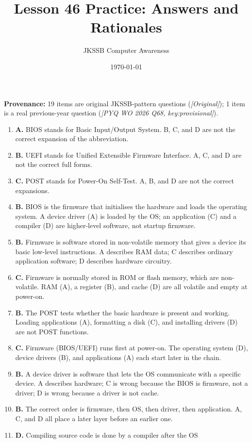 \documentclass[11pt]{article}
\title{Lesson 46 Practice: Answers and Rationales}
\author{JKSSB Computer Awareness}
\date{\today}
\begin{document}
\maketitle
\noindent\textbf{Provenance:} 19 items are original JKSSB-pattern questions
(\textit{[Original]}); 1 item is a real previous-year question
(\textit{[PYQ WO 2026 Q68, key:provisional]}).
\begin{enumerate}[label=\textbf{Q\arabic*.}, leftmargin=*]
\item \textbf{A.} BIOS stands for Basic Input/Output System. B, C, and D are
  not the correct expansion of the abbreviation.
\item \textbf{B.} UEFI stands for Unified Extensible Firmware Interface. A, C,
  and D are not the correct full forms.
\item \textbf{C.} POST stands for Power-On Self-Test. A, B, and D are not the
  correct expansions.
\item \textbf{B.} BIOS is the firmware that initialises the hardware and
  loads the operating system. A device driver (A) is loaded by the OS; an
  application (C) and a compiler (D) are higher-level software, not startup
  firmware.
\item \textbf{B.} Firmware is software stored in non-volatile memory that
  gives a device its basic low-level instructions. A describes RAM data; C
  describes ordinary application software; D describes hardware circuitry.
\item \textbf{C.} Firmware is normally stored in ROM or flash memory, which
  are non-volatile. RAM (A), a register (B), and cache (D) are all volatile
  and empty at power-on.
\item \textbf{B.} The POST tests whether the basic hardware is present and
  working. Loading applications (A), formatting a disk (C), and installing
  drivers (D) are not POST functions.
\item \textbf{C.} Firmware (BIOS/UEFI) runs first at power-on. The operating
  system (D), device drivers (B), and applications (A) each start later in
  the chain.
\item \textbf{B.} A device driver is software that lets the OS communicate
  with a specific device. A describes hardware; C is wrong because the BIOS
  is firmware, not a driver; D is wrong because a driver is not cache.
\item \textbf{B.} The correct order is firmware, then OS, then driver, then
  application. A, C, and D all place a later layer before an earlier one.
\item \textbf{D.} Compiling source code is done by a compiler after the OS

\end{enumerate}
\end{document}
